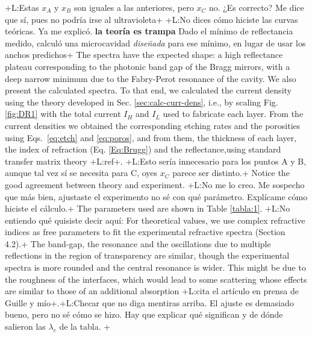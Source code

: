 \documentclass{article}
\newcommand{\notaL}[1]{{\color{blue}+L:#1+}}
\begin{document}
\notaL{Estas $x_A$ y $x_B$ son iguales a las anteriores, pero $x_C$
  no. ¿Es correcto? Me dice que sí, pues no podría irse al
  ultravioleta} \notaL{No dices cómo hiciste las curvas teóricas. Ya
  me explicó. {\bf la teoría es trampa} Dado el mínimo de reflectancia
medido, calculó una microcavidad {\em diseñada} para ese mínimo, en
lugar de usar los anchos predichos} The
spectra have the
expected shape: a high reflectance plateau corresponding to the
photonic band gap of the Bragg mirrors, with a deep narrow minimum due
to the Fabry-Perot resonance of the cavity. We also present the
calculated spectra. To that end, we calculated the current density
using the theory developed in Sec. \ref{sec:calc-curr-dens}, i.e., by
scaling Fig. \ref{fig:DR1} with the total current $I_H$ and $I_L$ used
to fabricate each layer. From the current densities we obtained the
corresponding etching rates and the porosities using
Eqs.~\eqref{eq:etch} and  \eqref{eq:poros}, and from them, the
thickness of each layer, the index of refraction
(Eq. \eqref{Eq:Brugg}) and the reflectance,using standard transfer
matrix theory \notaL{ref}. \notaL{Esto sería innecesario para los
  puntos A y B, aunque tal vez sí se necesita para C, oyes $x_C$
  parece ser distinto.}
Notice the good agreement between theory
and experiment. \notaL{No me lo creo. Me sospecho que más bien,
  ajustaste el experimento no sé con qué parámetro. Explícame cómo
  hiciste el cálculo.} The parameters used are shown in Table \ref{tabla:1}.
\notaL{No entiendo qué quisiste decir aquí: For theoretical values, we
  use complex refractive indices as free parameters to fit the
  experimental refractive spectra (Section 4.2).} The band-gap, the
resonance and the oscillations due to multiple reflections in the
region of transparency are similar, though the experimental spectra is
more rounded and the central resonance is wider. This might be due to
the roughness of the interfaces, which would lead to some scattering
whose effects are similar to those of an additional absorption
\notaL{cita el artículo en prensa de Guille y mío}.\notaL{Checar que no
  diga mentiras arriba. El ajuste es demasiado bueno, pero no sé cómo
  se hizo. Hay que explicar qué significan y de dónde salieron las
  $\lambda_c$ de la tabla. }
\end{document}
